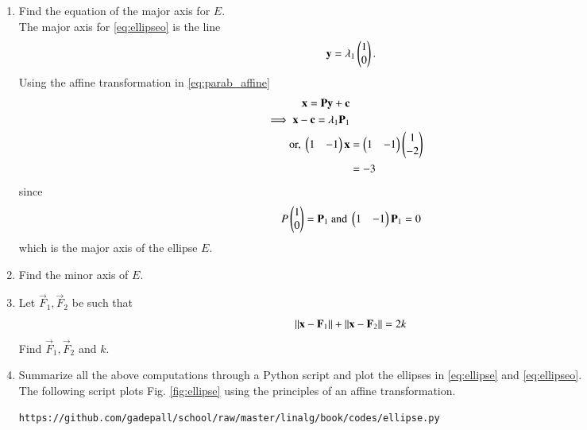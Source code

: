 \begin{enumerate}[label=\arabic*.,ref=\thesubsection.\theenumi]
\item Find the equation of the major axis for $E$.
\\
\solution  The major axis for \eqref{eq:ellipseo} is the line
\begin{equation}
\mathbf{y} = \lambda_1\begin{pmatrix}1 \\ 0\end{pmatrix}.
\end{equation}
Using the affine transformation in \eqref{eq:parab_affine}
\begin{align}
\mathbf{x}= \mathbf{P}\mathbf{y}+\mathbf{c}
\\ 
\implies  \mathbf{x}-\mathbf{c}= \lambda_1\mathbf{P}_1
\\ 
\text{or, }\begin{pmatrix}1 & -1\end{pmatrix}\mathbf{x}&= \begin{pmatrix}1 & -1\end{pmatrix}\begin{pmatrix}1 \\ -2\end{pmatrix}
\\
&= -3
\end{align}
%
since 
\begin{align}
P\begin{pmatrix}1 \\ 0\end{pmatrix}=\mathbf{P}_1\text{ and } \begin{pmatrix}1 & -1\end{pmatrix}\mathbf{P}_1 = 0
\end{align}
%
which is the major axis of the ellipse $E$.
\item Find the minor axis of $E$.
%
\item Let $\vec{F}_1,\vec{F}_2$ be such that
\begin{equation}
\left\lVert\mathbf{x}-\mathbf{F}_1\right\rVert
+\left\lVert\mathbf{x}-\mathbf{F}_2\right\rVert =2k
\end{equation}
Find $\vec{F}_1, \vec{F}_2$ and $k$.
\item Summarize all the above computations through a Python script and plot 
the ellipses in \eqref{eq:ellipse} and \eqref{eq:ellipseo}.
\\
\solution The following script plots Fig. \ref{fig:ellipse} using the 
principles of an affine transformation. 
\begin{lstlisting}
https://github.com/gadepall/school/raw/master/linalg/book/codes/ellipse.py
\end{lstlisting}
\begin{figure}[!ht]
\centering

\end{figure}
\end{enumerate}

